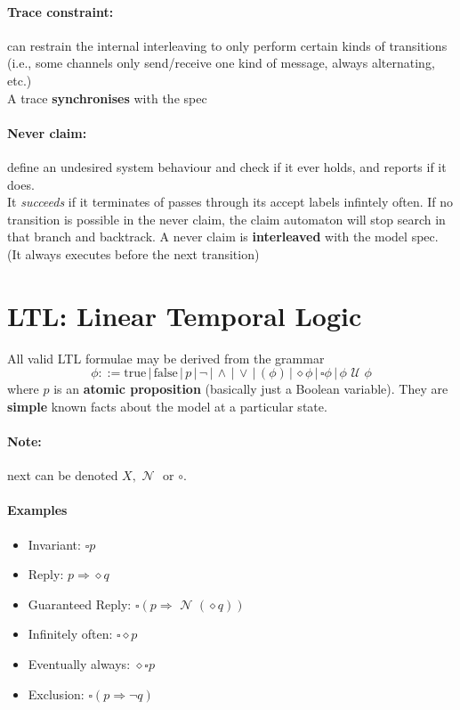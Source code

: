 \documentclass{article}
\newcommand{\U}{\,\,\mathcal{U}\,\,}
\newcommand{\N}{\,\,\mathcal{N}\,\,}
\begin{document}
\paragraph{Trace constraint:} can restrain the internal interleaving to only
perform certain kinds of transitions (i.e., some channels only send/receive one
kind of message, always alternating, etc.)
\\
A trace \textbf{synchronises} with the spec

\paragraph{Never claim:} define an undesired system behaviour and check if it
ever holds, and reports if it does.
\\
It \textit{succeeds} if it terminates of passes through its accept labels
infintely often. If no transition is possible in the never claim, the claim
automaton will stop search in that branch and backtrack.
A never claim is \textbf{interleaved} with the model spec. (It always executes
before the next transition)

\section{LTL: Linear Temporal Logic}
All valid LTL formulae may be derived from the grammar
\[
  \phi ::= \text{true} \,|\, \text{false} \,|\, p \,|\, \neg \,|\, \land \,|\,
  \lor \,|\, ( \phi ) \,|\, \diamond \phi \,|\, \square \phi \,|\, \phi \U \phi
\]
where $p$ is an \textbf{atomic proposition} (basically just a Boolean variable).
They are \textbf{simple} known facts about the model at a particular state.
\paragraph{Note:} next can be denoted $X, \N$ or $\circ$.
\paragraph{Examples}
\begin{itemize}
\item Invariant: $\square p$
\item Reply: $p \Rightarrow \diamond q$
\item Guaranteed Reply: $\square(p \Rightarrow \N (\diamond q))$
\item Infinitely often: $\square\diamond p$
\item Eventually always: $\diamond\square p$
\item Exclusion: $\square(p \Rightarrow \neg q)$
\end{itemize}
\end{document}
